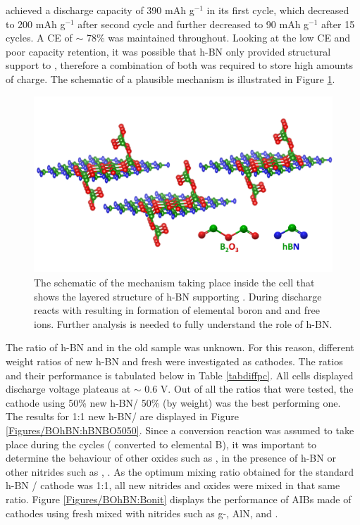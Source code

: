  achieved a discharge capacity of 390 mAh g$^{-1}$ in its first cycle, which decreased to 200 mAh g$^{-1}$ after second cycle and further decreased to 90 mAh g$^{-1}$ after 15 cycles. A CE of $\sim$ 78\% was maintained throughout. Looking at the low CE and poor capacity retention, it was possible that h-BN only provided structural support to , therefore a combination of both was required to store high amounts of charge. The schematic of a plausible mechanism is illustrated in Figure \ref{Figures/BOhBN:BonhBN}.  

\begin{figure}[tbh!]
\centering
\includegraphics[width=\textwidth]{Figures/BOhBN/BonhBN}
\caption{The schematic of the mechanism taking place inside the cell that shows the layered structure of h-BN supporting . During discharge  reacts with  resulting in formation of elemental boron and  and free  ions. Further analysis is needed to fully understand the role of h-BN.}
\label{Figures/BOhBN:BonhBN}
\end{figure}

The ratio of h-BN and  in the old sample was unknown. For this reason, different weight ratios of new h-BN and fresh  were investigated as cathodes. The ratios and their performance is tabulated below in Table \ref{tabdiffpc}. All cells displayed discharge voltage plateaus at $\sim$ 0.6 V. Out of all the ratios that were tested, the cathode using 50\% new h-BN/ 50\%  (by weight) was the best performing one. The results for 1:1 new h-BN/ are displayed in Figure \ref{Figures/BOhBN:hBNBO5050}. Since a conversion reaction was assumed to take place during the cycles ( converted to elemental B), it was important to determine the behaviour of other oxides such as ,  in the presence of h-BN or other nitrides such as , . As the optimum mixing ratio obtained for the standard h-BN / cathode was 1:1, all new nitrides and oxides were mixed in that same ratio. Figure \ref{Figures/BOhBN:Bonit} displays the performance of AIBs made of cathodes using fresh  mixed with nitrides such as g-, AlN, and  . 

